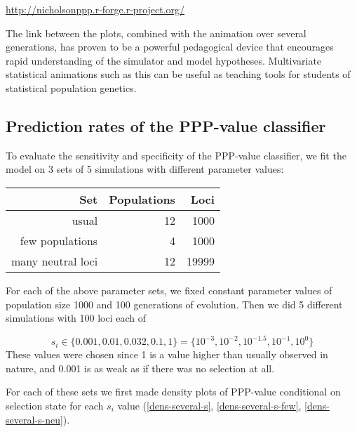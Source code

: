 \documentclass[a4paper,12pt]{article}
\begin{document}
\url{http://nicholsonppp.r-forge.r-project.org/}

The link between the plots, combined with the animation over several
generations, has proven to be a powerful pedagogical device that
encourages rapid understanding of the simulator and model
hypotheses. Multivariate statistical animations such as this can be
useful as teaching tools for students of statistical population
genetics.

\subsection{Prediction rates of the PPP-value classifier}

To evaluate the sensitivity and specificity of the PPP-value
classifier, we fit the model on 3 sets of 5 simulations with different
parameter values:

\begin{center}
\begin{tabular}{rrr}
  Set & Populations & Loci \\
  \hline
  usual & 12 & 1000 \\ %
  few populations & 4 & 1000\\   %
  many neutral loci & 12 & 19999   %
\end{tabular}
\end{center}

For each of the above parameter sets, we fixed constant parameter
values of population size 1000 and 100 generations of evolution. Then
we did 5 different simulations with 100 loci each of

$$
s_i\in\{0.001,0.01,0.032,0.1,1\}=\{10^{-3},10^{-2},10^{-1.5},10^{-1},10^0\}
$$
These values were chosen since 1 is a value higher than usually
observed in nature, and 0.001 is as weak as if there was no selection
at all.

For each of these sets we first made density plots of PPP-value
conditional on selection state for each $s_i$ value
(\autoref{dens-several-s}, \autoref{dens-several-s-few},
\autoref{dens-several-s-neu}).


\end{document}

